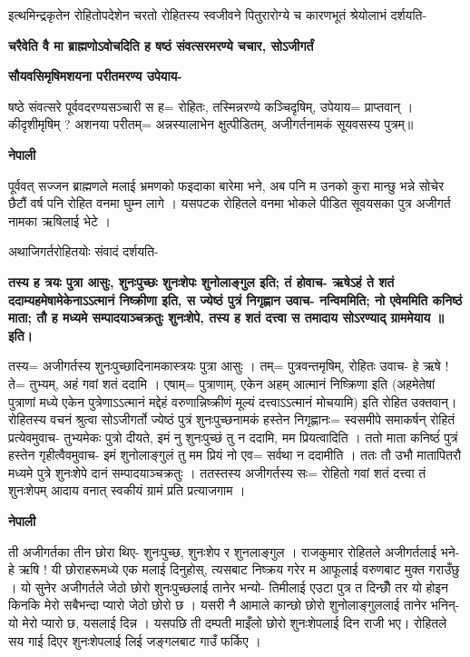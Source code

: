 \documentclass[11pt, a5paper]{article}
\begin{document}
इत्थमिन्द्रकृतेन रोहितोपदेशेन चरतो रोहितस्य  स्वजीवने पितुरारोग्ये च कारणभूतं श्रेयोलाभं दर्शयति-

\textbf{चरैवेति वै मा ब्राह्मणोऽवोचदिति ह षष्ठं संवत्सरमरण्ये चचार, सोऽजीगर्तं}

\textbf{सौयवसिमृषिमशयना परीतमरण्य उपेयाय-}

षष्ठे संवत्सरे पूर्ववदरण्यसञ्चारी स ह= रोहितः, तस्मिन्नरण्ये  कञ्चिदृषिम्, उपेयाय= प्राप्तवान् । कीदृशीमृषिम् ? अशनया परीतम्= अन्नस्यालाभेन क्षुत्पीडितम्, अजीगर्तनामकं सूयवसस्य पुत्रम्॥

\textbf{नेपाली}

पूर्ववत् सज्जन ब्राह्मणले मलाई भ्रमणको फइदाका बारेमा भने, अब पनि म उनको कुरा मान्छु भन्ने सोचेर छैटौं वर्ष पनि रोहित वनमा घुम्न लागे । यसपटक रोहितले वनमा भोकले पीडित सूवयसका पुत्र अजीगर्त नामका ऋषिलाई भेटे ।

अथाजिगर्तरोहितयोः संवादं दर्शयति-

\textbf{तस्य ह त्रयः पुत्रा आसुः, शुनःपुच्छः शुनःशेपः शुनोलाङ्‍गुल इति; तं होवाच- ऋषेऽहं ते शतं ददाम्यहमेषामेकेनाऽऽत्मानं निष्क्रीणा इति, स ज्येष्ठं पुत्रं निगृह्णान उवाच- नन्विममिति; नो एवेममिति कनिष्ठं माता; तौ ह मध्यमे सम्पादयाञ्चक्रतुः शुनःशेपे, तस्य ह शतं दत्त्वा स तमादाय सोऽरण्याद् ग्राममेयाय ॥ इति।}

तस्य= अजीगर्तस्य शुनःपुच्छादिनामकास्त्रयः पुत्रा आसुः । तम्= पुत्रवन्तमृषिम्, रोहितः उवाच- हे ऋषे ! ते= तुभ्यम्, अहं गवां शतं ददामि । एषाम्= पुत्राणाम्,  एकेन अहम् आत्मानं निष्क्रिणा इति (अहमेतेषां पुत्राणां मध्ये एकेन पुत्रेणाऽऽत्मानं मद्देहं वरुणान्निष्क्रीणं मूल्यं दत्त्वाऽऽत्मानं मोचयामि) इति रोहित उक्तवान्। रोहितस्य वचनं श्रुत्वा सोऽजीगर्तो ज्येष्ठं पुत्रं शुनःपुच्छनामकं हस्तेन निगृह्णानः= स्वसमीपे समाकर्षन् रोहितं प्रत्येवमुवाच- तुभ्यमेकः पुत्रो दीयते, इमं नु शुनःपुच्छं तु न ददामि, मम प्रियत्वादिति । ततो माता कनिष्ठंं पुत्रं हस्तेन गृहीत्वैवमुवाच- इमं शुनोलाङ्‍गुलं तु मम प्रियं नो एव= सर्वथा न ददामीति । ततः तौ उभौ मातापितरौ मध्यमे पुत्रे शुनःशेपे दानं सम्पादयाञ्चक्रतुः । ततस्तस्य अजीगर्तस्य सः= रोहितो गवां शतं दत्त्वा तं शुनःशेपम् आदाय वनात् स्वकीयं ग्रामं प्रति प्रत्याजगाम ।

\textbf{नेपाली}

ती अजीगर्तका तीन छोरा थिए- शुनःपुच्छ, शुनःशेप र शुनलाङ्‍गुल । राजकुमार रोहितले अजीगर्तलाई भने- हे ऋषि ! यी छोराहरूमध्ये एक मलाई दिनुहोस्, त्यसबाट निष्क्रय गरेर म आफूलाई वरुणबाट मुक्त गराउँछु । यो सुनेर अजीगर्तले जेठो छोरो शुनःपुच्छलाई तानेर भन्यो- तिमीलाई एउटा पुत्र त दिन्छौँ तर यो होइन किनकि मेरो सबैभन्दा प्यारो जेठो छोरो छ । यसरी नै आमाले कान्छो छोरो शुनोलाङ्‌गुललाई तानेर भनिन्- यो मेरो प्यारो छ, यसलाई दिन्न । यसपछि ती दम्पती माइँलो छोरो शुनःशेपलाई दिन राजी भए। रोहितले सय गाई दिएर शुनःशेपलाई लिई जङ्‍गलबाट गाउँ फर्किए ।
\end{document}
